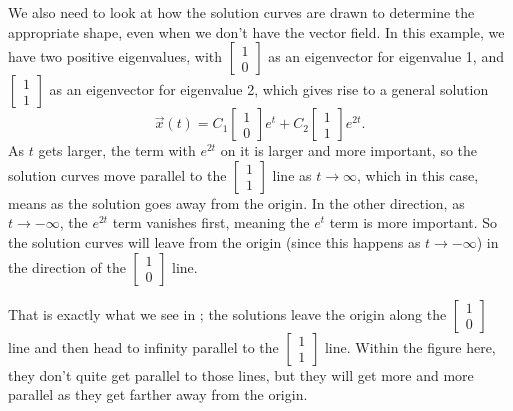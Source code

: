 We also need to look at how the solution curves are drawn to determine the appropriate shape, even when we don't have the vector field. In this example, we have two positive eigenvalues, with $\left[\begin{smallmatrix} 1 \\ 0 \end{smallmatrix}\right]$ as an eigenvector for eigenvalue 1, and $\left[\begin{smallmatrix} 1 \\ 1 \end{smallmatrix}\right]$ as an eigenvector for eigenvalue 2, which gives rise to a general solution 
\[ \vec{x}(t) = C_1 \begin{bmatrix} 1\\ 0 \end{bmatrix}e^t + C_2 \begin{bmatrix}  1 \\ 1 \end{bmatrix}e^{2t}.\]
As $t$ gets larger, the term with $e^{2t}$ on it is larger and more important, so the solution curves move parallel to the $\left[\begin{smallmatrix} 1 \\ 1 \end{smallmatrix}\right]$ line as $t\rightarrow \infty$, which in this case, means as the solution goes away from the origin. In the other direction, as $t \rightarrow -\infty$, the $e^{2t}$ term vanishes first, meaning the $e^t$ term is more important. So the solution curves will leave from the origin (since this happens as $t \rightarrow -\infty$) in the direction of the $\left[\begin{smallmatrix} 1 \\ 0 \end{smallmatrix}\right]$ line. 

That is exactly what we see in ; the solutions leave the origin along the $\left[\begin{smallmatrix} 1 \\ 0 \end{smallmatrix}\right]$ line and then head to infinity parallel to the $\left[\begin{smallmatrix} 1 \\ 1 \end{smallmatrix}\right]$ line. Within the figure here, they don't quite get parallel to those lines, but they will get more and more parallel as they get farther away from the origin. 

